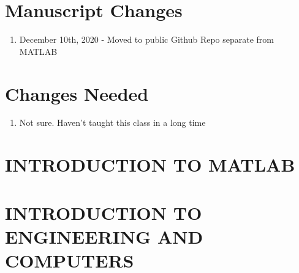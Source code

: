 \documentclass{book}
\begin{document}


\section*{Manuscript Changes}

\begin{enumerate}[itemsep=-5pt]
\item December 10th, 2020 - Moved to public Github Repo separate from MATLAB
\end{enumerate}

\newpage

\section*{Changes Needed}

\begin{enumerate}[itemsep=-5pt]
  \item Not sure. Haven't taught this class in a long time
\end{enumerate}

\newpage

\tableofcontents

%

%

%

%


\section{INTRODUCTION TO MATLAB}

















%

\section{INTRODUCTION TO ENGINEERING AND COMPUTERS}
\end{document}
